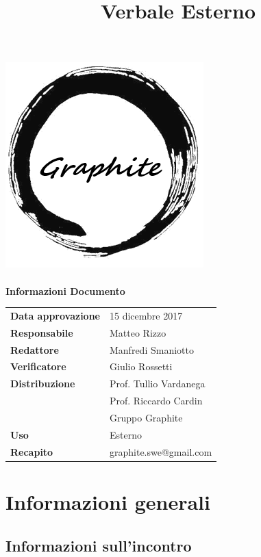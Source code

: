 \documentclass[openany,12pt,a4paper]{article}
\title{Verbale Esterno}
\author{}
\begin{document}
	\makeatletter
	\begin{titlepage}
		\setlength{\headsep}{0pt}  
		\begin{center}
			\includegraphics[width=0.5\linewidth]{Logo.png}\\[1em]
			{\huge \bfseries  \@title }\\[10ex]
			\textbf{\Large Informazioni Documento} \\[2em]
			\bgroup
			\def\arraystretch{1.5}
			\begin{tabular}{l|l}
				\textbf{Data approvazione} & 15 dicembre 2017 \\
				\textbf{Responsabile} & Matteo Rizzo \\
				\textbf{Redattore} & Manfredi Smaniotto \\
				\textbf{Verificatore} & Giulio Rossetti \\
				\textbf{Distribuzione} & Prof. Tullio Vardanega \\
				 & Prof. Riccardo Cardin \\
				 & Gruppo Graphite \\
				\textbf{Uso} & Esterno \\
				\textbf{Recapito} & graphite.swe@gmail.com \\
			\end{tabular}
		\egroup
		\end{center}
	\end{titlepage}
	\makeatother

	\thispagestyle{empty}
	\newpage
	
	\tableofcontents
	\newpage
	
	\section{Informazioni generali}
	
	\subsection{Informazioni sull'incontro}
	
\end{document}
